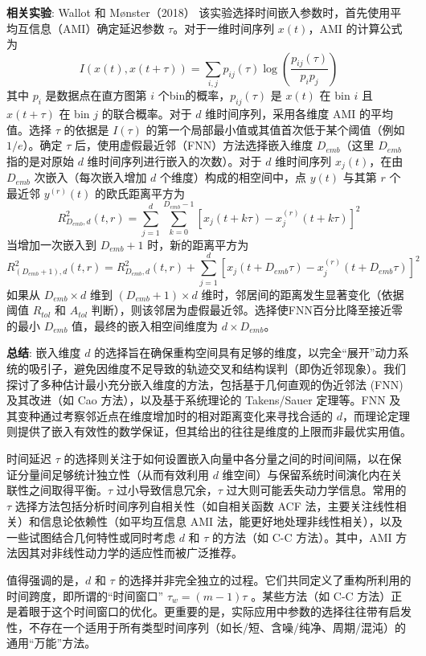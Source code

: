 \textbf{相关实验}: Wallot 和 Mønster（2018）\cite{wallot2018calculation} 该实验选择时间嵌入参数时，首先使用平均互信息（AMI）确定延迟参数 $\tau$。对于一维时间序列 $x(t)$，AMI 的计算公式为
$$I(x(t),x(t+\tau))=\sum_{i,j}p_{ij}(\tau)\log\left(\frac{p_{ij}(\tau)}{p_{i}p_{j}}\right)$$
其中 $p_i$ 是数据点在直方图第 $i$ 个bin的概率，$p_{ij}(\tau)$ 是 $x(t)$ 在 bin $i$ 且 $x(t+\tau)$ 在 bin $j$ 的联合概率。对于 $d$ 维时间序列，采用各维度 AMI 的平均值。选择 $\tau$ 的依据是 $I(\tau)$ 的第一个局部最小值或其值首次低于某个阈值（例如 $1/e$）。确定 $\tau$ 后，使用虚假最近邻（FNN）方法选择嵌入维度 $D_{emb}$（这里 $D_{emb}$ 指的是对原始 $d$ 维时间序列进行嵌入的次数）。对于 $d$ 维时间序列 $x_j(t)$，在由 $D_{emb}$ 次嵌入（每次嵌入增加 $d$ 个维度）构成的相空间中，点 $y(t)$ 与其第 $r$ 个最近邻 $y^{(r)}(t)$ 的欧氏距离平方为
$$R_{D_{emb},d}^{2}(t,r)=\sum_{j=1}^{d}\sum_{k=0}^{D_{emb}-1}[x_{j}(t+k\tau)-x_{j}^{(r)}(t+k\tau)]^{2}$$
当增加一次嵌入到 $D_{emb}+1$ 时，新的距离平方为
$$R_{(D_{emb}+1),d}^{2}(t,r)=R_{D_{emb},d}^{2}(t,r)+\sum_{j=1}^{d}[x_{j}(t+D_{emb}\tau)-x_{j}^{(r)}(t+D_{emb}\tau)]^{2}$$
如果从 $D_{emb} \times d$ 维到 $(D_{emb}+1) \times d$ 维时，邻居间的距离发生显著变化（依据阈值 $R_{tol}$ 和 $A_{tol}$ 判断），则该邻居为虚假最近邻。选择使FNN百分比降至接近零的最小 $D_{emb}$ 值，最终的嵌入相空间维度为 $d \times D_{emb}$。

\textbf{总结}:
嵌入维度 $d$ 的选择旨在确保重构空间具有足够的维度，以完全“展开”动力系统的吸引子，避免因维度不足导致的轨迹交叉和结构误判（即伪近邻现象）。我们探讨了多种估计最小充分嵌入维度的方法，包括基于几何直观的伪近邻法 (FNN) 及其改进（如 Cao 方法），以及基于系统理论的 Takens/Sauer 定理等。FNN 及其变种通过考察邻近点在维度增加时的相对距离变化来寻找合适的 $d$，而理论定理则提供了嵌入有效性的数学保证，但其给出的往往是维度的上限而非最优实用值。

时间延迟 $\tau$ 的选择则关注于如何设置嵌入向量中各分量之间的时间间隔，以在保证分量间足够统计独立性（从而有效利用 $d$ 维空间）与保留系统时间演化内在关联性之间取得平衡。$\tau$ 过小导致信息冗余，$\tau$ 过大则可能丢失动力学信息。常用的 $\tau$ 选择方法包括分析时间序列自相关性（如自相关函数 ACF 法，主要关注线性相关）和信息论依赖性（如平均互信息 AMI 法，能更好地处理非线性相关），以及一些试图结合几何特性或同时考虑 $d$ 和 $\tau$ 的方法（如 C-C 方法）。其中，AMI 方法因其对非线性动力学的适应性而被广泛推荐。

值得强调的是，$d$ 和 $\tau$ 的选择并非完全独立的过程。它们共同定义了重构所利用的时间跨度，即所谓的“时间窗口” $\tau_w = (m-1)\tau$ 。某些方法（如 C-C 方法）正是着眼于这个时间窗口的优化。更重要的是，实际应用中参数的选择往往带有启发性，不存在一个适用于所有类型时间序列（如长/短、含噪/纯净、周期/混沌）的通用“万能”方法。


